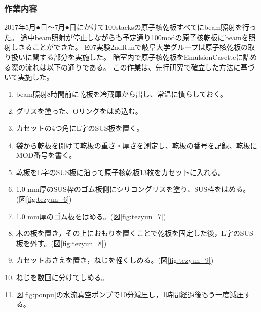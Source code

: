 \documentclass[12pt,a4paper]{jarticle}
\begin{document}
\subsubsection{作業内容}
2017年5月●日～7月●日にかけて100stacksの原子核乾板すべてにbeam照射を行った。
途中beam照射が停止しながらも予定通り100modの原子核乾板にbeamを照射しきることができた。
E07実験2ndRunで岐阜大学グループは原子核乾板の取り扱いに関する部分を実施した。
暗室内で原子核乾板をEmulsionCasetteに詰める際の流れは以下の通りである。
この作業は、先行研究で確立した方法に基づいて実施した。\cite{endo}
\begin{enumerate}
    \item beam照射8時間前に乾板を冷蔵庫から出し、常温に慣らしておく。
    \item グリスを塗った、Oリングをはめ込む。
    \item カセットの4つ角にL字のSUS板を置く。 
    \item 袋から乾板を開けて乾板の重さ・厚さを測定し、乾板の番号を記録、乾板にMOD番号を書く。
    \item 乾板をL字のSUS板に沿って原子核乾板13枚をカセットに入れる。
    \item 1.0 mm厚のSUS枠のゴム板側にシリコングリスを塗り、SUS枠をはめる。(図\ref{fig:tezyun_6})
    \item 1.0 mm厚のゴム板をはめる。(図\ref{fig:tezyun_7})
    \item 木の板を置き，その上におもりを置くことで乾板を固定した後，L字のSUS板を外す。(図\ref{fig:tezyun_8})
    \item カセットおさえを置き，ねじを軽くしめる。(図\ref{fig:tezyun_9})
    \item ねじを数回に分けてしめる。
    \item 図\ref{fig:ponpu}の水流真空ポンプで10分減圧し，1時間経過後もう一度減圧する。
\end{enumerate}
\end{document}
